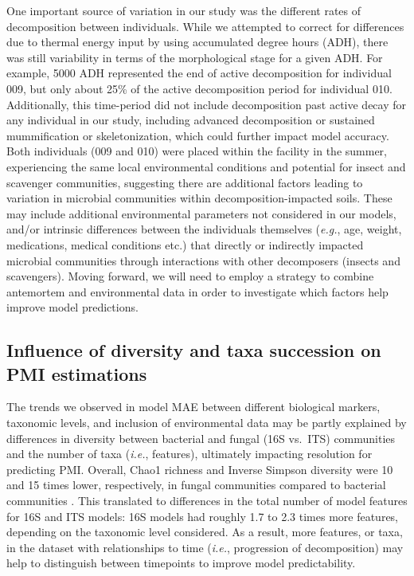 \documentclass[
  10pt,
  letterpaper,
]{article}
\begin{document}
One important source of variation in our study was the different rates
of decomposition between individuals. While we attempted to correct for
differences due to thermal energy input by using accumulated degree
hours (ADH), there was still variability in terms of the morphological
stage for a given ADH. For example, 5000 ADH represented the end of
active decomposition for individual 009, but only about 25\% of the
active decomposition period for individual 010. Additionally, this
time-period did not include decomposition past active decay for any
individual in our study, including advanced decomposition or sustained
mummification or skeletonization, which could further impact model
accuracy. Both individuals (009 and 010) were placed within the facility
in the summer, experiencing the same local environmental conditions and
potential for insect and scavenger communities, suggesting there are
additional factors leading to variation in microbial communities within
decomposition-impacted soils. These may include additional environmental
parameters not considered in our models, and/or intrinsic differences
between the individuals themselves (\emph{e.g.}, age, weight,
medications, medical conditions etc.) that directly or indirectly
impacted microbial communities through interactions with other
decomposers (insects and scavengers). Moving forward, we will need to
employ a strategy to combine antemortem and environmental data in order
to investigate which factors help improve model predictions.

\subsection{Influence of diversity and taxa succession on PMI
estimations}\label{influence-of-diversity-and-taxa-succession-on-pmi-estimations}

The trends we observed in model MAE between different biological
markers, taxonomic levels, and inclusion of environmental data may be
partly explained by differences in diversity between bacterial and
fungal (16S vs.~ITS) communities and the number of taxa (\emph{i.e.},
features), ultimately impacting resolution for predicting PMI. Overall,
Chao1 richness and Inverse Simpson diversity were 10 and 15 times lower,
respectively, in fungal communities compared to bacterial communities
\citep{mason_body_2022}. This translated to differences in the total
number of model features for 16S and ITS models: 16S models had roughly
1.7 to 2.3 times more features, depending on the taxonomic level
considered. As a result, more features, or taxa, in the dataset with
relationships to time (\emph{i.e.}, progression of decomposition) may
help to distinguish between timepoints to improve model predictability.
\end{document}
